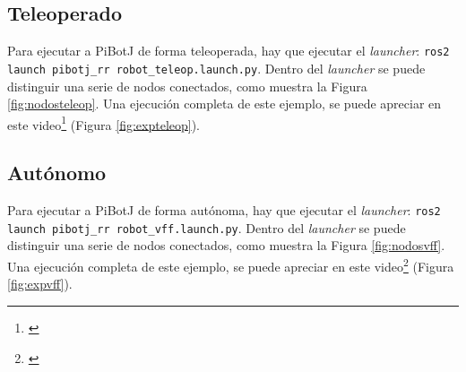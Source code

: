 \subsection{Teleoperado}

Para ejecutar a PiBotJ de forma teleoperada, hay que ejecutar el \textit{launcher}: \verb|ros2 launch pibotj_rr robot_teleop.launch.py|. Dentro del \textit{launcher} se puede distinguir una serie de nodos conectados, como muestra la Figura \ref{fig:nodosteleop}. Una ejecución completa de este ejemplo, se puede apreciar en este video\footnote{\url{}} (Figura \ref{fig:expteleop}). 

 



\subsection{Autónomo}

Para ejecutar a PiBotJ de forma autónoma, hay que ejecutar el \textit{launcher}: \verb|ros2 launch pibotj_rr robot_vff.launch.py|. Dentro del \textit{launcher} se puede distinguir una serie de nodos conectados, como muestra la Figura \ref{fig:nodosvff}. Una ejecución completa de este ejemplo, se puede apreciar en este video\footnote{\url{}} (Figura \ref{fig:expvff}). 


